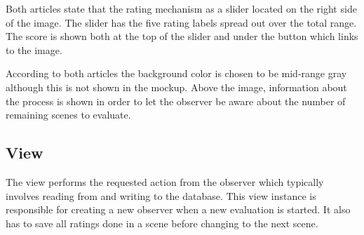 Both articles state that the rating mechanism as a slider located on the right side of the image. The slider has the five rating labels spread out over the total range. The score is shown both at the top of the slider and under the button which links to the image.

According to both articles the background color is chosen to be mid-range gray although this is not shown in the mockup. Above the image, information about the process is shown in order to let the observer be aware about the number of remaining scenes to evaluate.


\subsection{View} %
\label{sub:view}

The view performs the requested action from the observer which typically involves reading from and writing to the database. This view instance is responsible for creating a new observer when a new evaluation is started. It also has to save all ratings done in a scene before changing to the next scene.



